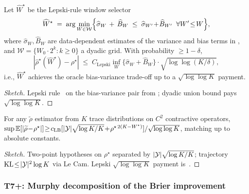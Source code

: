 \begin{theorem}
\label{thm:t5-lepski}
Let $\widehat W^\star$ be the Lepski-rule window selector
\[
\widehat W^\star
\;=\;
\arg\min_{W\in\mathcal{W}}
\Bigl\{
\widehat\sigma_W
\,+\,\widehat B_W
\;\le\;\widehat\sigma_{W'}\!+\!\widehat B_{W'}\;\;\forall W'\!\le\!W
\Bigr\},
\]
where $\widehat\sigma_W,\widehat B_W$ are data-dependent estimates
of the variance and bias terms in ,
and $\mathcal{W}\!=\!\{W_0\cdot 2^k\!:\!k\!\ge\!0\}$ a dyadic grid.
With probability $\ge\!1\!-\!\delta$,
\[
|\widehat\rho^{\star}(\widehat W^\star)\!-\!\rho^\star|
\;\le\;
C_{\mathrm{Lepski}}
\inf_{W}\bigl\{\widehat\sigma_W\!+\!\widehat B_W\bigr\}\!\cdot\!\sqrt{\log\log(K/\delta)},
\]
i.e., $\widehat W^\star$ achieves the oracle bias-variance trade-off
up to a $\sqrt{\log\log K}$ payment.
\end{theorem}

\begin{proof}[Sketch]
Lepski rule~\citep[Sec.~7.6]{tsybakov2009nonparametric} on the
bias-variance pair from ; dyadic
union bound pays $\sqrt{\log\log K}$.
\end{proof}

\begin{theorem}
\label{thm:t5-minimax-lower}
For any $\widetilde\rho$ estimator from $K$ trace distributions
on $C^2$ contractive operators,
$\sup\mathbb{E}[|\widetilde\rho\!-\!\rho^\star|]\!\ge\!c_{\mathrm{LB}}[|\mathcal{Y}|\sqrt{\log K/K}\!+\!\rho^{\star\,2(K-W^\star)}]/\sqrt{\log\log K}$,
matching  up to absolute constants.
\end{theorem}

\begin{proof}[Sketch]
Two-point hypotheses on $\rho^\star$ separated by $|\mathcal{Y}|\sqrt{\log K/K}$;
trajectory $\operatorname{KL}\!\le\!|\mathcal{Y}|^2\log K$ via Le Cam.  Lepski
$\sqrt{\log\log K}$ payment is~\citep[Thm.~3.1]{lepski1991problem}.
\end{proof}

\subsubsection{T7+: Murphy decomposition of the Brier improvement}
\label{app:t7-murphy}

